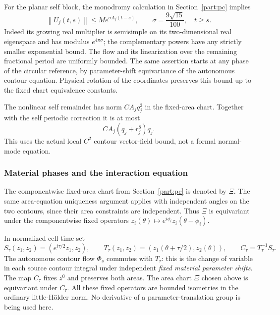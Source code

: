 \documentclass[11pt]{amsart}
\theoremstyle{remark}
\numberwithin{equation}{section}
\newcommand{\norm}[1]{\left\lVert#1\right\rVert}
\begin{document}
For the planar self block, the monodromy calculation in Section~\ref{part:pc} implies
\[
 \norm{U_j(t,s)}\le M e^{\sigma A_j(t-s)},\qquad
 \sigma=\frac{9\sqrt{15}}{100},\quad t\ge s.
\]
Indeed its growing real multiplier is semisimple on its two-dimensional real eigenspace and has modulus $e^{4\pi\sigma}$; the complementary powers have any strictly smaller exponential bound. The flow and its linearization over the remaining fractional period are uniformly bounded. The same assertion starts at any phase of the circular reference, by parameter-shift equivariance of the autonomous contour equation. Physical rotation of the coordinates preserves this bound up to the fixed chart equivalence constants.

The nonlinear self remainder has norm $C A_jq_j^2$ in the fixed-area chart. Together with the self periodic correction it is at most
\[
 C A_j(q_j+r_j^8)q_j.
\]
This uses the actual local $C^2$ contour vector-field bound, not a formal normal-mode equation.

\subsubsection{Material phases and the interaction equation}

The componentwise fixed-area chart from Section~\ref{part:pc} is denoted by $\Xi$. The same area-equation uniqueness argument applies with independent angles on the two contours, since their area constraints are independent. Thus $\Xi$ is equivariant under the componentwise fixed operators $z_i(\theta)\mapsto e^{i\phi_i}z_i(\theta-\phi_i)$.

In normalized cell time set
\[
 S_\tau(z_1,z_2)=(e^{i\tau/2}z_1,z_2),\qquad
 T_\tau(z_1,z_2)=(z_1(\theta+\tau/2),z_2(\theta)),\qquad
 C_\tau=T_\tau^{-1}S_\tau.
\]
The autonomous contour flow $\Phi_s$ commutes with $T_\tau$: this is
the change of variable in each source contour integral under independent
\emph{fixed material parameter shifts}. The map $C_\tau$ fixes $z^0$
and preserves both areas. The area chart $\Xi$ chosen above is equivariant
under $C_\tau$. All these fixed operators are bounded isometries in the
ordinary little-H\"older norm. No derivative of a parameter-translation
group is being used here.
\end{document}
